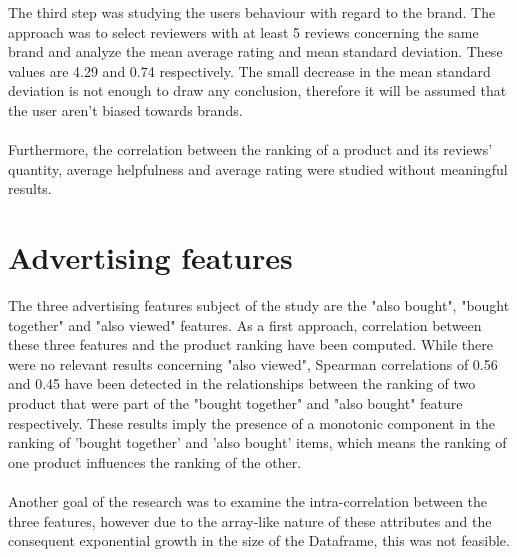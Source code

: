 \documentclass[11pt]{article}
\begin{document}
The third step was studying the users behaviour with regard to the brand. The approach was to select reviewers with at least 5 reviews concerning the same brand and analyze the mean average rating and mean standard deviation. These values are 4.29 and 0.74 respectively. The small decrease in the mean standard deviation is not enough to draw any conclusion, therefore it will be assumed that the user aren't biased towards brands.\\\\
Furthermore, the correlation between the ranking of a product and its reviews' quantity, average helpfulness and average rating were studied without meaningful results.

\section{Advertising features}
  The three advertising features subject of the study are the "also bought", "bought together" and "also viewed" features. As a first approach, correlation between these three features and the product ranking have been computed. While there were no relevant results concerning "also viewed", Spearman correlations of 0.56 and 0.45 have been detected in the relationships between the ranking of two product that were part of the "bought together" and "also bought" feature respectively. These results imply the presence of a monotonic component in the ranking of 'bought together' and 'also bought' items, which means the ranking of one product influences the ranking of the other. \\\\
Another goal of the research was to examine the intra-correlation between the three features, however due to the array-like nature of these attributes and the consequent exponential growth in the size of the Dataframe, this was not feasible.
\end{document}

